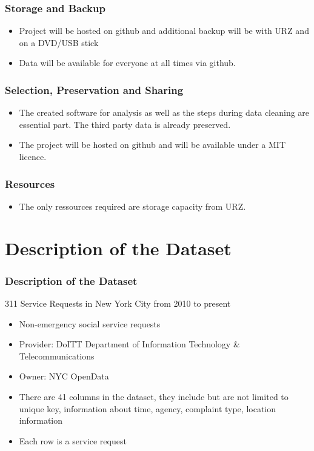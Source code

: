 \documentclass{beamer}
\begin{document}
\begin{frame}
\frametitle{Storage and Backup}
\begin{itemize}
\item Project will be hosted on github and additional backup will be with URZ and on a DVD/USB stick
\vfill
\item Data will be available for everyone at all times via github.
\end{itemize}
\end{frame}
\begin{frame}
\frametitle{Selection, Preservation and Sharing}
\begin{itemize}
\item The created software for analysis as well as the steps during data cleaning are essential part. The third party data is already preserved.
\vfill
\item The project will be hosted on github and will be available under a MIT licence.
\end{itemize}
\end{frame}
\begin{frame}
\frametitle{Resources}
\begin{itemize}
\item The only ressources required are storage capacity from URZ.
\end{itemize}
\end{frame}
\section{Description of the Dataset}
\begin{frame}
\frametitle{Description of the Dataset}
311 Service Requests in New York City from 2010 to present
\vfill
\begin{itemize}
\item Non-emergency social service requests
\vfill
\item Provider: DoITT Department of Information Technology \& Telecommunications
\vfill
\item Owner: NYC OpenData
\vfill
\item There are 41 columns in the dataset, they include but are not limited to unique key, information about time, agency, complaint type, location information
\item Each row is a service request
\end{itemize}
\end{frame}
\end{document}
